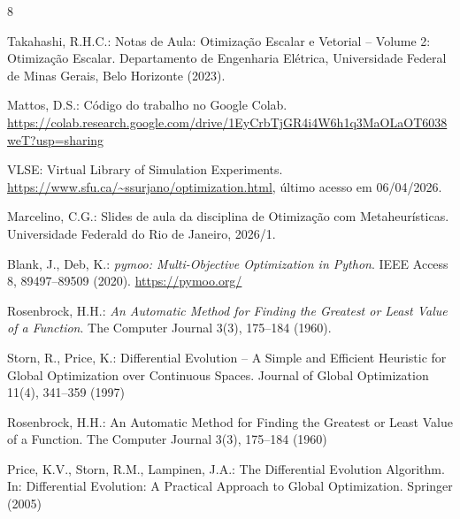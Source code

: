 \documentclass[runningheads]{llncs}
\begin{document}
\begin{thebibliography}{8}

Takahashi, R.H.C.: Notas de Aula: Otimização Escalar e Vetorial -- Volume 2: Otimização Escalar.
Departamento de Engenharia Elétrica, Universidade Federal de Minas Gerais, Belo Horizonte (2023).

Mattos, D.S.: Código do trabalho no Google Colab.
\url{https://colab.research.google.com/drive/1EyCrbTjGR4i4W6h1q3MaOLaOT6038weT?usp=sharing}

VLSE: Virtual Library of Simulation Experiments.
\url{https://www.sfu.ca/~ssurjano/optimization.html}, último acesso em 06/04/2026.

Marcelino, C.G.: Slides de aula da disciplina de Otimização com Metaheurísticas.
Universidade Federald do Rio de Janeiro,
2026/1.

Blank, J., Deb, K.: \textit{pymoo: Multi-Objective Optimization in Python}.
IEEE Access 8, 89497--89509 (2020).
\url{https://pymoo.org/}

Rosenbrock, H.H.: \textit{An Automatic Method for Finding the Greatest or Least Value of a Function}.
The Computer Journal 3(3), 175--184 (1960).

Storn, R., Price, K.: Differential Evolution -- A Simple and Efficient Heuristic for Global Optimization over Continuous Spaces. Journal of Global Optimization 11(4), 341--359 (1997)

Rosenbrock, H.H.: An Automatic Method for Finding the Greatest or Least Value of a Function. The Computer Journal 3(3), 175--184 (1960)

Price, K.V., Storn, R.M., Lampinen, J.A.: The Differential Evolution Algorithm. In: Differential Evolution: A Practical Approach to Global Optimization. Springer (2005)

\end{thebibliography}
\end{document}
